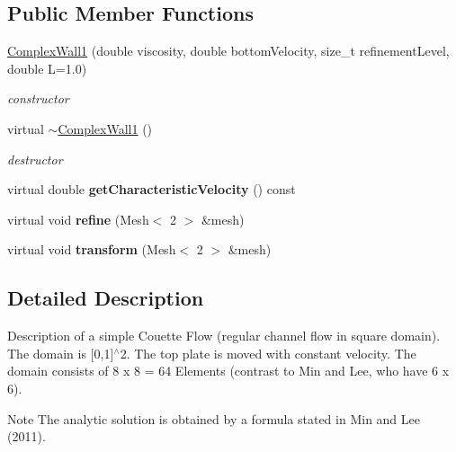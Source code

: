 \subsection*{Public Member Functions}
\begin{DoxyCompactItemize}
\item 
\hyperlink{classnatrium_1_1ComplexWall1_ad619c81f979a47c447fc0061bed20e05}{ComplexWall1} (double viscosity, double bottomVelocity, size\_\-t refinementLevel, double L=1.0)
\begin{DoxyCompactList}\small\item\em constructor \item\end{DoxyCompactList}\item 
\hypertarget{classnatrium_1_1ComplexWall1_a6d68cdec98529c139716ae98e8149d30}{
virtual \hyperlink{classnatrium_1_1ComplexWall1_a6d68cdec98529c139716ae98e8149d30}{$\sim$ComplexWall1} ()}
\label{classnatrium_1_1ComplexWall1_a6d68cdec98529c139716ae98e8149d30}

\begin{DoxyCompactList}\small\item\em destructor \item\end{DoxyCompactList}\item 
\hypertarget{classnatrium_1_1ComplexWall1_a782e4262d5c717656803f43eb4e05202}{
virtual double {\bfseries getCharacteristicVelocity} () const }
\label{classnatrium_1_1ComplexWall1_a782e4262d5c717656803f43eb4e05202}

\item 
\hypertarget{classnatrium_1_1ComplexWall1_a605109508f3967cfa827ca9e18e308b2}{
virtual void {\bfseries refine} (Mesh$<$ 2 $>$ \&mesh)}
\label{classnatrium_1_1ComplexWall1_a605109508f3967cfa827ca9e18e308b2}

\item 
\hypertarget{classnatrium_1_1ComplexWall1_a3bdc79475f84f14e49ff1dcc93f16648}{
virtual void {\bfseries transform} (Mesh$<$ 2 $>$ \&mesh)}
\label{classnatrium_1_1ComplexWall1_a3bdc79475f84f14e49ff1dcc93f16648}

\end{DoxyCompactItemize}


\subsection{Detailed Description}
Description of a simple Couette Flow (regular channel flow in square domain). The domain is \mbox{[}0,1\mbox{]}$^\wedge$2. The top plate is moved with constant velocity. The domain consists of 8 x 8 = 64 Elements (contrast to Min and Lee, who have 6 x 6). \begin{DoxyNote}{Note}
The analytic solution is obtained by a formula stated in Min and Lee (2011). 
\end{DoxyNote}


